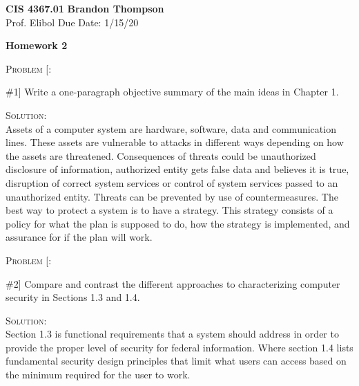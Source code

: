 \documentclass[12pt]{article}
\newenvironment{problem}[1]
{\begin{mdframed}[linewidth=0.6pt]
        \textsc{Problem #1:}

}
    {\end{mdframed}}
\newenvironment{solution}
    {\textsc{Solution:}\\}
    {\newpage}%
\begin{document}
\noindent
\textbf{CIS 4367.01} \hfill \textbf{Brandon Thompson} \\
\normalsize Prof. Elibol \hfill Due Date: 1/15/20 \\

\begin{center}
\textbf{Homework 2}
\end{center}
	\begin{problem}[\#1]
		Write a one-paragraph objective summary of the main ideas in Chapter 1.
	\end{problem}
	\begin{solution}
		Assets of a computer system are hardware, software, data and communication lines.
		These assets are vulnerable to attacks in different ways depending on how the
		assets are threatened. Consequences of threats could be unauthorized disclosure
		of information, authorized entity gets false data and believes it is true,
		disruption of correct system services or control of system services passed to
		an unauthorized entity. Threats can be prevented by use of countermeasures.
		The best way to protect a system is to have a strategy. This strategy consists of
		a policy for what the plan is supposed to do, how the strategy is implemented,
		and assurance for if the plan will work.
	\end{solution}

	\begin{problem}[\#2]
		Compare and contrast the different approaches to characterizing computer
		security in Sections 1.3 and 1.4.
	\end{problem}
	\begin{solution}
		Section 1.3 is functional requirements that a system should address in order to
		provide the proper level of security for federal information. Where section
		1.4 lists fundamental security design principles that limit what users can
		access based on the minimum required for the user to work.
	\end{solution}
\end{document}
